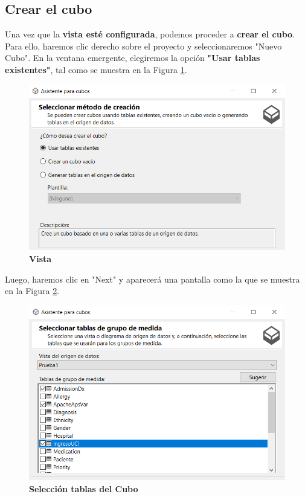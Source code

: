 \documentclass[12pt, a4paper, twoside]{article}
\begin{document}
\subsection{\textbf{Crear el cubo}}

Una vez que la \textbf{vista esté configurada}, podemos proceder a \textbf{crear el cubo}. Para ello, haremos clic derecho sobre el proyecto y seleccionaremos "Nuevo Cubo". En la ventana emergente, elegiremos la opción \textbf{"Usar tablas existentes"}, tal como se muestra en la Figura \ref{fig:9}.

\begin{figure}[H]
	\centering
	\includegraphics[width=1\textwidth]{image/crearCubo}
	\caption{\textbf{Vista}}
	\label{fig:9}
\end{figure}

Luego, haremos clic en "Next" y aparecerá una pantalla como la que se muestra en la Figura \ref{fig:10}.

\begin{figure}[H]
	\centering
	\includegraphics[width=1\textwidth]{image/seleccionTablasCubo}
	\caption{\textbf{Selección tablas del Cubo}}
	\label{fig:10}
\end{figure}
\end{document}
